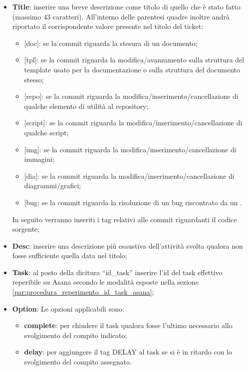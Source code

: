 					\begin{itemize}
						\item \textbf{Title}: inserire una breve descrizione come titolo di quello che è stato fatto (massimo 43 caratteri). All'interno delle parentesi quadre inoltre andrà riportato il corrispondente valore presente nel titolo del ticket\gloss{}:
							\begin{itemize}
								\item {[}doc{]}: se la commit\gloss{} riguarda la stesura di un documento;
								\item {[}tpl{]}: se la commit\gloss{} riguarda la modifica/avanzamento sulla struttura del template\gloss{} usato per la documentazione o sulla struttura del documento stesso;
								\item {[}repo{]}: se la commit\gloss{} riguarda la modifica/inserimento/cancellazione di qualche elemento di utilità al repository\gloss{};
								\item {[}script{]}: se la commit\gloss{} riguarda la modifica/inserimento/cancellazione di qualche script;
								\item {[}img{]}: se la commit\gloss{} riguarda la modifica/inserimento/cancellazione di immagini;
								\item {[}dia{]}: se la commit\gloss{} riguarda la modifica/inserimento/cancellazione di diagrammi/grafici;
								\item {[}bug\gloss{}{]}: se la commit\gloss{} riguarda la risoluzione di un bug riscontrato da un \roleVerifier.
							\end{itemize}
							\noindent
							In seguito verranno inseriti i tag relativi alle commit\gloss{} riguardanti il codice sorgente;
							
						\item \textbf{Desc}: inserire una descrizione più esaustiva dell'attività svolta qualora non fosse sufficiente quella data nel titolo;
						\item \textbf{Task}: al posto della dicitura ``id\_task'' inserire l'id del task effettivo reperibile su Asana secondo le modalità esposte nella sezione \ref{par:procedura_reperimento_id_task_asana};
						\item \textbf{Option}: Le opzioni applicabili sono:
							\begin{itemize}
								\item \textbf{complete}: per chiudere il task\gloss{} qualora fosse l'ultimo necessario allo svolgimento del compito indicato;
								\item \textbf{delay}: per aggiungere il tag DELAY al task\gloss{} se si è in ritardo con lo svolgimento del compito assegnato.
							\end{itemize}
					\end{itemize}
									
